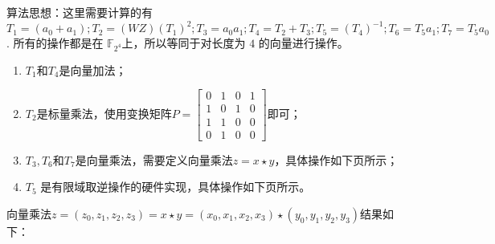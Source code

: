 \documentclass[12pt,a4paper]{ctexbook}
\newcommand{\0}{\textbf{0}}
\newcommand{\1}{\textbf{1}}
\newcommand{\F}{\mathbb{F}}
\begin{document}
    算法思想：这里需要计算的有 $ T_1=(a_0+a_1);T_2=(WZ) (T_1 )^2;T_3=a_0 a_1;T_4=T_2+T_3;T_5=(T_4 )^{-1};T_6=T_5 a_1;T_7=T_5 a_0 $. 所有的操作都是在 $\F_{2^4} $上，所以等同于对长度为 $4$ 的向量进行操作。
    \begin{enumerate}
        \item $T_1$和$T_4$是向量加法；
        \item $T_2$是标量乘法，使用变换矩阵$P=\begin{bmatrix}
            0 &1 &0 &1\\
            1 &0 &1 &0\\
            1 &1 &0 &0\\
            0 &1 &0 &0
        \end{bmatrix}$即可；
        \item $T_3, T_6$和$T_7$是向量乘法，需要定义向量乘法$z=x\star y$，具体操作如下页所示；
        \item $T_5$ 是有限域取逆操作的硬件实现，具体操作如下页所示。
    \end{enumerate}

    向量乘法$z=(z_0,z_1,z_2,z_3 )=x\star y=(x_0,x_1,x_2,x_3 )\star (y_0,y_1,y_2,y_3 )$结果如下：

    
\end{document}
